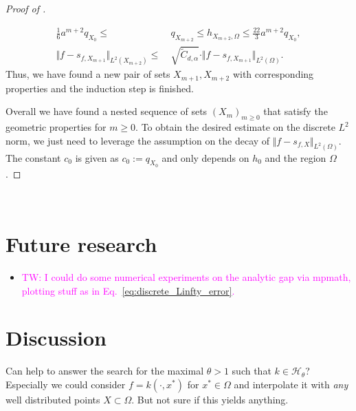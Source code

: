 \documentclass[a4paper, 10pt]{article}
\newcommand{\tw}[1]{\textcolor{magenta}{TW: #1}}
\newif\ifappendix
\begin{document}
\begin{proof}[Proof of ]
\begin{enumerate}
\begin{align*}
\frac{1}{6} a^{m+2} q_{X_0} \leq& ~ q_{X_{m+2}} \leq h_{X_{m+2}, \Omega} \leq \frac{22}{3} a^{m+2} q_{X_0}, \\
\Vert f - s_{f, X_{m+1}} \Vert_{L^2(X_{m+2})} \leq& ~ \sqrt{\tilde{C}_{d, \alpha}} \cdot \Vert f - s_{f, X_{m+1}} \Vert_{L^2(\Omega)}. 
\end{align*}
Thus, we have found a new pair of sets $X_{m+1}, X_{m+2}$ with corresponding properties and the induction step is finished.
\end{enumerate}
Overall we have found a nested sequence of sets $(X_m)_{m \geq 0}$ that satisfy the geometric properties for $m \geq 0$.
To obtain the desired estimate on the discrete $L^2$ norm, we just need to leverage the assumption on the decay of $\Vert f - s_{f, X} \Vert_{L^2(\Omega)}$.
The constant $c_0$ is given as $c_0 := q_{X_0}$ and only depends on $h_0$ and the region $\Omega$.
\end{proof}



%
%
%
%
%
%
%
%
%
%
%
%
%
%
%
%
%
%
%
%
%
%
%
%
%
%
%
%
%




%
%


%
%

%

%

%
%
%
%
%
%
%
%
%



\ifappendix

~ \newpage
~ \newpage

\section{Future research}

\begin{itemize}
\item \tw{I could do some numerical experiments on the analytic gap via mpmath, plotting stuff as in Eq.~\eqref{eq:discrete_Linfty_error}.}
\end{itemize}

\section{Discussion} \label{sec:disucssion}


\begin{idea}
Can  help to answer the search for the maximal $\theta > 1$ such that $k \in \mathcal{H}_\theta$?
Especially we could consider $f = k(\cdot, x^*)$ for $x^* \in \Omega$ and interpolate it with \textit{any} well distributed points $X \subset \Omega$.
But not sure if this yields anything.
\end{idea}
\end{document}
